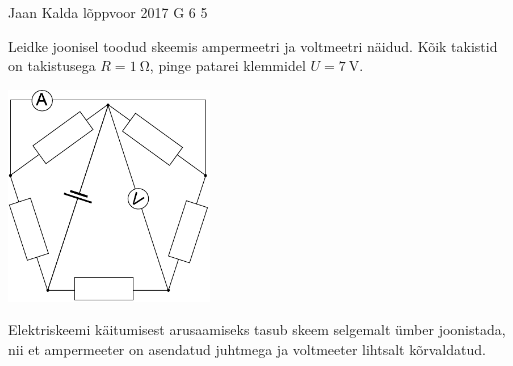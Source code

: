 {Jaan Kalda} %
{lõppvoor} %
{2017} %
{G 6} %
{5} %
{
\ifStatement
Leidke joonisel toodud skeemis ampermeetri ja voltmeetri näidud. Kõik takistid on takistusega $R=\SI{1}{\ohm}$, pinge patarei klemmidel $U=\SI{7}{\volt}$.

\begin{center}
	\includegraphics[width=0.4\textwidth]{2017-v3g-06-viisnurk}
\end{center}
\fi


\ifHint
Elektriskeemi käitumisest arusaamiseks tasub skeem selgemalt ümber joonistada, nii et ampermeeter on asendatud juhtmega ja voltmeeter lihtsalt kõrvaldatud.
\fi


}
